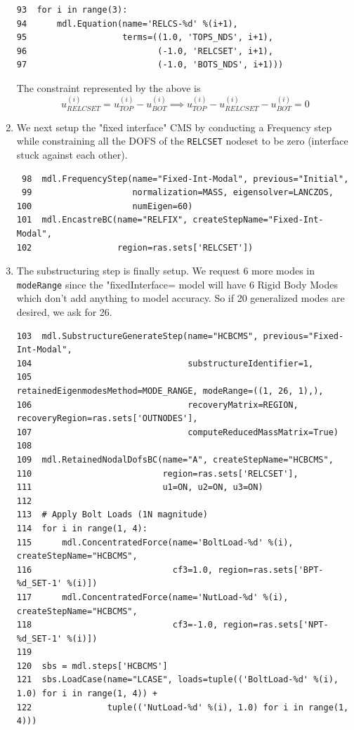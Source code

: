 \documentclass[11pt]{article}
\begin{document}
\begin{enumerate}
\begin{verbatim}
93  for i in range(3):
94      mdl.Equation(name='RELCS-%d' %(i+1),
95                   terms=((1.0, 'TOPS_NDS', i+1),
96                          (-1.0, 'RELCSET', i+1),
97                          (-1.0, 'BOTS_NDS', i+1)))
\end{verbatim}
The constraint represented by the above is
$$ u^{(i)}_{RELCSET} = u^{(i)}_{TOP} - u^{(i)}_{BOT} \implies
   u^{(i)}_{TOP} - u^{(i)}_{RELCSET} - u^{(i)}_{BOT} = 0 $$
\item We next setup the "fixed interface" CMS by conducting a Frequency step while constraining all the DOFS of the \texttt{RELCSET} nodeset to be zero (interface stuck against each other).
\begin{verbatim}
 98  mdl.FrequencyStep(name="Fixed-Int-Modal", previous="Initial",
 99                    normalization=MASS, eigensolver=LANCZOS,
100                    numEigen=60)
101  mdl.EncastreBC(name="RELFIX", createStepName="Fixed-Int-Modal",
102                 region=ras.sets['RELCSET'])
\end{verbatim}
\item The substructuring step is finally setup.
We request 6 more modes in \texttt{modeRange} since the "fixedInterface= model will have 6 Rigid Body Modes which don't add anything to model accuracy.
So if 20 generalized modes are desired, we ask for 26. 
\begin{verbatim}
103  mdl.SubstructureGenerateStep(name="HCBCMS", previous="Fixed-Int-Modal",
104                               substructureIdentifier=1, 
105                               retainedEigenmodesMethod=MODE_RANGE, modeRange=((1, 26, 1),),
106                               recoveryMatrix=REGION, recoveryRegion=ras.sets['OUTNODES'],
107                               computeReducedMassMatrix=True)
108  
109  mdl.RetainedNodalDofsBC(name="A", createStepName="HCBCMS",
110                          region=ras.sets['RELCSET'],
111                          u1=ON, u2=ON, u3=ON)
112  
113  # Apply Bolt Loads (1N magnitude)
114  for i in range(1, 4):
115      mdl.ConcentratedForce(name='BoltLoad-%d' %(i), createStepName="HCBCMS",
116                            cf3=1.0, region=ras.sets['BPT-%d_SET-1' %(i)])
117      mdl.ConcentratedForce(name='NutLoad-%d' %(i), createStepName="HCBCMS",
118                            cf3=-1.0, region=ras.sets['NPT-%d_SET-1' %(i)])
119  
120  sbs = mdl.steps['HCBCMS']
121  sbs.LoadCase(name="LCASE", loads=tuple(('BoltLoad-%d' %(i), 1.0) for i in range(1, 4)) +
122               tuple(('NutLoad-%d' %(i), 1.0) for i in range(1, 4)))
\end{verbatim}

\end{enumerate}
\end{document}
